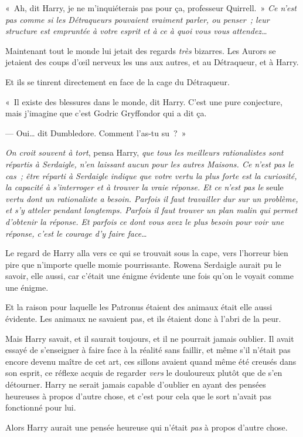 «~Ah, dit Harry, je ne m'inquiéterais pas pour ça, professeur Quirrell.~»
\emph{Ce n'est pas comme si les Détraqueurs pouvaient vraiment parler, ou penser~; leur structure est empruntée à votre esprit et à ce à quoi vous vous attendez…}

Maintenant tout le monde lui jetait des regards \emph{très} bizarres.
Les Aurors se jetaient des coups d'œil nerveux les uns aux autres, et au Détraqueur, et à Harry.

Et ils se tinrent directement en face de la cage du Détraqueur.

«~Il existe des blessures dans le monde, dit Harry.
C'est une pure conjecture, mais j'imagine que c'est Godric Gryffondor qui a dit ça.

--- Oui… dit Dumbledore.
Comment l'as-tu su~?~»

\emph{On croit souvent à tort}, pensa Harry, \emph{que tous les meilleurs rationalistes sont répartis à Serdaigle, n'en laissant aucun pour les autres Maisons.
Ce n'est pas le cas~; être réparti à Serdaigle indique que votre vertu la plus forte est la curiosité, la capacité à s'interroger et à trouver la vraie réponse.
Et ce n'est pas le} seule \emph{vertu dont un rationaliste a besoin.
Parfois il faut travailler dur sur un problème, et s'y atteler pendant longtemps.
Parfois il faut trouver un plan malin qui permet d'obtenir la réponse.
Et parfois ce dont vous avez le plus besoin pour voir une réponse, c'est le courage d'y faire face…}

Le regard de Harry alla vers ce qui se trouvait sous la cape, vers l'horreur bien pire que n'importe quelle momie pourrissante.
Rowena Serdaigle aurait pu le savoir, elle aussi, car c'était une énigme évidente une fois qu'on le voyait comme une énigme.

Et la raison pour laquelle les Patronus étaient des animaux était elle aussi évidente.
Les animaux ne savaient pas, et ils étaient donc à l'abri de la peur.

Mais Harry savait, et il saurait toujours, et il ne pourrait jamais oublier.
Il avait essayé de s'enseigner à faire face à la réalité sans faillir, et même s'il n'était pas encore devenu maître de cet art, ces sillons avaient quand même été creusés dans son esprit, ce réflexe acquis de regarder \emph{vers} le douloureux plutôt que de s'en détourner.
Harry ne serait jamais capable d'oublier en ayant des pensées heureuses à propos d'autre chose, et c'est pour cela que le sort n'avait pas fonctionné pour lui.

Alors Harry aurait une pensée heureuse qui n'était \emph{pas} à propos d'autre chose.

